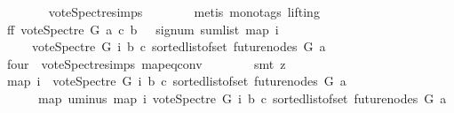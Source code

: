 \begin{isabellebody}
\ \ \ \ \ \ \isamarkupfalse%
\ vote{\isacharunderscore}{\kern0pt}Spectre{\isachardot}{\kern0pt}simps\isanewline
\ \ \ \ \ \ \isamarkupfalse%
\ {\isacharparenleft}{\kern0pt}metis\ {\isacharparenleft}{\kern0pt}mono{\isacharunderscore}{\kern0pt}tags{\isacharcomma}{\kern0pt}\ lifting{\isacharparenright}{\kern0pt}{\isacharparenright}{\kern0pt}\ \isanewline
\ \ \ \ \isamarkupfalse%
\ \isamarkupfalse%
\ ff{}{\isacharcolon}{\kern0pt}\ {\isachardoublequoteopen}vote{\isacharunderscore}{\kern0pt}Spectre\ G\ a\ c\ b\ {\isacharequal}{\kern0pt}\ \ signum\ {\isacharparenleft}{\kern0pt}sum{\isacharunderscore}{\kern0pt}list\ {\isacharparenleft}{\kern0pt}map\ {\isacharparenleft}{\kern0pt}{\isasymlambda}i{\isachardot}{\kern0pt}\isanewline
\ \ \ \ {\isacharparenleft}{\kern0pt}{\isacharminus}{\kern0pt}\ vote{\isacharunderscore}{\kern0pt}Spectre\ G\ i\ b\ c{\isacharparenright}{\kern0pt}{\isacharparenright}{\kern0pt}\ {\isacharparenleft}{\kern0pt}sorted{\isacharunderscore}{\kern0pt}list{\isacharunderscore}{\kern0pt}of{\isacharunderscore}{\kern0pt}set\ {\isacharparenleft}{\kern0pt}future{\isacharunderscore}{\kern0pt}nodes\ G\ a{\isacharparenright}{\kern0pt}{\isacharparenright}{\kern0pt}{\isacharparenright}{\kern0pt}{\isacharparenright}{\kern0pt}{\isachardoublequoteclose}\ \isanewline
\ \ \ \ \ \ \isamarkupfalse%
\ four\ {}\ vote{\isacharunderscore}{\kern0pt}Spectre{\isachardot}{\kern0pt}simps\ map{\isacharunderscore}{\kern0pt}eq{\isacharunderscore}{\kern0pt}conv\isanewline
\ \ \ \ \ \ \isamarkupfalse%
\ {\isacharparenleft}{\kern0pt}smt\ {\isacharparenleft}{\kern0pt}z{}{\isacharparenright}{\kern0pt}{\isacharparenright}{\kern0pt}\ \isanewline
\ \ \ \ \isamarkupfalse%
\ {\isachardoublequoteopen}{\isacharparenleft}{\kern0pt}map\ {\isacharparenleft}{\kern0pt}{\isasymlambda}i{\isachardot}{\kern0pt}\ {\isacharminus}{\kern0pt}\ vote{\isacharunderscore}{\kern0pt}Spectre\ G\ i\ b\ c{\isacharparenright}{\kern0pt}\ {\isacharparenleft}{\kern0pt}sorted{\isacharunderscore}{\kern0pt}list{\isacharunderscore}{\kern0pt}of{\isacharunderscore}{\kern0pt}set\ {\isacharparenleft}{\kern0pt}future{\isacharunderscore}{\kern0pt}nodes\ G\ a{\isacharparenright}{\kern0pt}{\isacharparenright}{\kern0pt}{\isacharparenright}{\kern0pt}\isanewline
\ \ \ \ \ {\isacharequal}{\kern0pt}\ {\isacharparenleft}{\kern0pt}map\ uminus\ {\isacharparenleft}{\kern0pt}map\ {\isacharparenleft}{\kern0pt}{\isasymlambda}i{\isachardot}{\kern0pt}\ vote{\isacharunderscore}{\kern0pt}Spectre\ G\ i\ b\ c{\isacharparenright}{\kern0pt}\ {\isacharparenleft}{\kern0pt}sorted{\isacharunderscore}{\kern0pt}list{\isacharunderscore}{\kern0pt}of{\isacharunderscore}{\kern0pt}set\ {\isacharparenleft}{\kern0pt}future{\isacharunderscore}{\kern0pt}nodes\ G\ a{\isacharparenright}{\kern0pt}{\isacharparenright}{\kern0pt}{\isacharparenright}{\kern0pt}{\isacharparenright}{\kern0pt}{\isachardoublequoteclose}\ \isanewline

\end{isabellebody}
